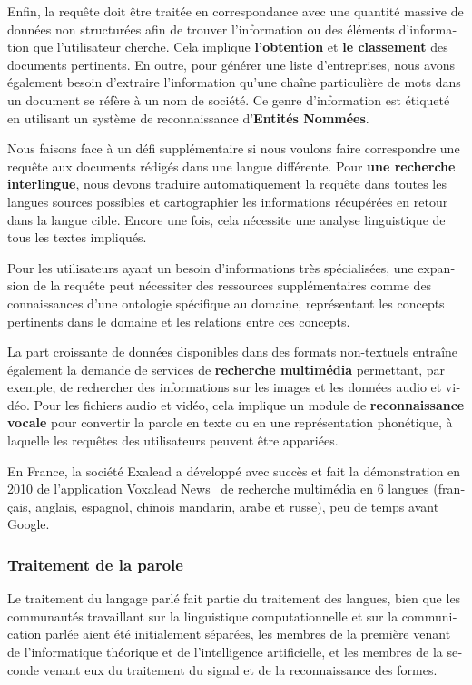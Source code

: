 \begin{french}
\begin{multicols}{2}
Enfin, la requête doit être traitée en correspondance avec une
quantité massive de données non structurées afin de trouver
l'information ou des éléments d'information que l'utilisateur
cherche. Cela implique {\bf l'obtention} et {\bf le classement} des documents
pertinents. En outre, pour générer une liste d'entreprises, nous avons
également besoin d'extraire l'information qu'une chaîne particulière
de mots dans un document se réfère à un nom de société. Ce genre
d'information est étiqueté en utilisant un système de reconnaissance
d'{\bf Entités Nommées}.

Nous faisons face à un défi supplémentaire si nous voulons faire
correspondre une requête aux documents rédigés dans une langue
différente. Pour {\bf une recherche interlingue}, nous devons traduire
automatiquement la requête dans toutes les langues sources possibles
et cartographier les informations récupérées en retour dans la langue
cible. Encore une fois, cela nécessite une analyse linguistique de
tous les textes impliqués.

Pour les utilisateurs ayant un besoin d'informations très
spécialisées, une expansion de la requête peut nécessiter des
ressources supplémentaires comme des connaissances d'une ontologie
spécifique au domaine, représentant les concepts pertinents dans le
domaine et les relations entre ces concepts.

La part croissante de données disponibles dans des formats non-textuels
entraîne également la demande de services de {\bf recherche multimédia}
permettant, par exemple, de rechercher des informations sur les
images et les données audio et vidéo. Pour les fichiers audio et vidéo, cela
implique un module de {\bf reconnaissance vocale} pour convertir la parole
en texte ou en une représentation phonétique, à laquelle les requêtes
des utilisateurs peuvent être appariées.

En France, la société Exalead a développé avec succès et fait la démonstration en 2010 de 
l'application Voxalead News~\cite{voxaleadnews} de recherche multimédia en 6 langues
(français, anglais, espagnol, chinois mandarin, arabe et russe),
peu de temps avant Google.

\subsubsection{Traitement de la parole}
Le traitement du langage parlé fait partie du traitement des langues,
bien que les communautés travaillant sur la linguistique
computationnelle et sur la communication parlée aient été initialement
séparées, les membres de la première venant de l'informatique
théorique et de l'intelligence artificielle, et les membres de
la seconde venant eux du traitement du signal et de la reconnaissance
des formes.


\end{multicols}
\end{french}
